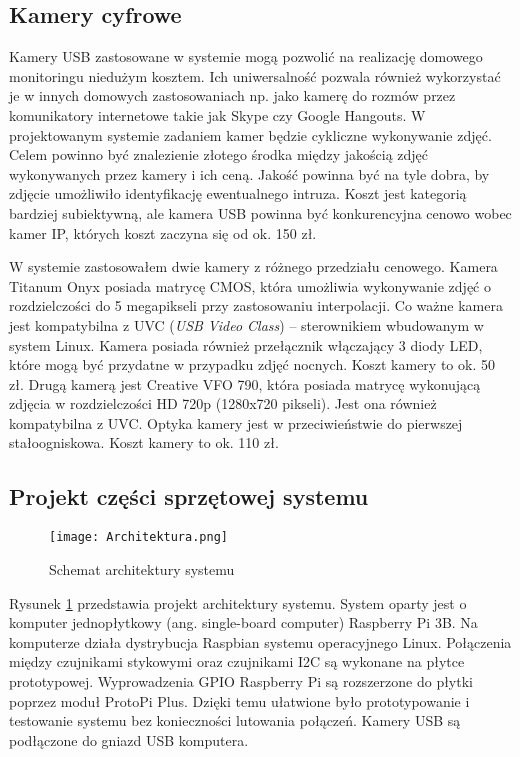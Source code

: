 \documentclass[a4paper,12pt,twoside]{article}
\begin{document}
\subsection{Kamery cyfrowe}
Kamery USB zastosowane w systemie mogą pozwolić na realizację domowego monitoringu niedużym kosztem. Ich uniwersalność pozwala również wykorzystać je w innych domowych zastosowaniach np. jako kamerę do rozmów przez komunikatory internetowe takie jak Skype czy Google Hangouts. W projektowanym systemie zadaniem kamer będzie cykliczne wykonywanie zdjęć. Celem powinno być znalezienie złotego środka między jakością zdjęć wykonywanych przez kamery i ich ceną. Jakość powinna być na tyle dobra, by zdjęcie umożliwiło identyfikację ewentualnego intruza. Koszt jest kategorią bardziej subiektywną, ale kamera USB powinna być konkurencyjna cenowo wobec kamer IP, których koszt zaczyna się od ok. 150 zł.\cite{komputer_świat}

W systemie zastosowałem dwie kamery z różnego przedziału cenowego. Kamera Titanum Onyx posiada matrycę CMOS, która umożliwia wykonywanie zdjęć o rozdzielczości do 5 megapikseli przy zastosowaniu interpolacji. Co ważne kamera jest kompatybilna z UVC (\textit{USB Video Class}) -- sterownikiem wbudowanym w system Linux. Kamera posiada również przełącznik włączający 3 diody LED, które mogą być przydatne w przypadku zdjęć nocnych. Koszt kamery to ok. 50 zł. Drugą kamerą jest Creative VFO 790, która posiada matrycę wykonującą zdjęcia w rozdzielczości HD 720p (1280x720 pikseli). Jest ona również kompatybilna z UVC. Optyka kamery jest w przeciwieństwie do pierwszej stałoogniskowa. Koszt kamery to ok. 110 zł.

\subsection{Projekt części sprzętowej systemu}
\begin{figure}[h]
\texttt{[image: Architektura.png]}
\caption{Schemat architektury systemu}
\label{fig: architektura}
\end{figure}

Rysunek \ref{fig: architektura} przedstawia projekt architektury systemu. System oparty jest o komputer jednopłytkowy (ang. single-board computer) Raspberry Pi 3B. Na komputerze działa dystrybucja Raspbian systemu operacyjnego Linux. Połączenia między czujnikami stykowymi oraz czujnikami I2C są wykonane na płytce prototypowej. Wyprowadzenia GPIO Raspberry Pi są rozszerzone do płytki poprzez moduł ProtoPi Plus. Dzięki temu ułatwione było prototypowanie i testowanie systemu bez konieczności lutowania połączeń. Kamery USB są podłączone do gniazd USB komputera.
\end{document}

